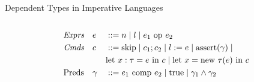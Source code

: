 \documentclass[aspectratio=169]{beamer}
\begin{document}
\begin{frame}{Dependent Types in Imperative Languages}
{\begin{columns}[T]
\begin{column}{0.45\textwidth}
\begin{alignat*}{2}
\textit{Exprs}\quad &e &&::= n \altm l \altm e_1 \text{ op } e_2
\\
\textit{Cmds}\quad &c &&::= \text{skip} \altm c_1;c_2 \altm l := e \altm \text{assert}(\gamma) \altm
\\
~ & ~ && \text{let } x : \tau = e \text { in } c \altm \text{let } x = \text{new } \tau(e) \text{ in } c
\\
\text{Preds}\quad &\gamma &&::= e_1 \text{ comp } e_2 \altm \text{true} \altm \gamma_1 \wedge \gamma_2
\end{alignat*}
\end{column}
\end{columns}
}

\vspace{0.1in}

\end{frame}
\end{document}
